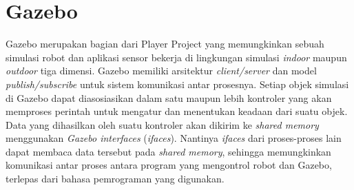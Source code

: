 \section{Gazebo}
\label{sec:gazebo}

Gazebo \citep{cit:koenig2004} merupakan bagian dari Player Project \citep{cit:gerkey2003} yang memungkinkan sebuah simulasi robot dan aplikasi sensor bekerja di lingkungan simulasi \emph{indoor} maupun \emph{outdoor} tiga dimensi.
Gazebo memiliki arsitektur \emph{client/server} dan model \emph{publish/subscribe} untuk sistem komunikasi antar prosesnya.
Setiap objek simulasi di Gazebo dapat diasosiasikan dalam satu maupun lebih kontroler yang akan memproses perintah untuk mengatur dan menentukan keadaan dari suatu objek.
Data yang dihasilkan oleh suatu kontroler akan dikirim ke \emph{shared memory} menggunakan \emph{Gazebo interfaces} (\emph{ifaces}).
Nantinya \emph{ifaces} dari proses-proses lain dapat membaca data tersebut pada \emph{shared memory}, sehingga memungkinkan komunikasi antar proses antara program yang mengontrol robot dan Gazebo, terlepas dari bahasa pemrograman yang digunakan.

